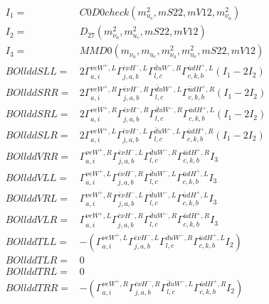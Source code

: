 \documentclass[A4,landscape]{article}
\begin{document}
\begin{align} 
I_1 = & C0D0check(m^2_{u_{{c}}}, mS22, mV12, m^2_{\nu_{{a}}}) \\ 
I_2 = & D_{27}(m^2_{\nu_{{a}}}, m^2_{u_{{c}}}, mS22, mV12) \\ 
I_3 = & MMD0(m_{\nu_{{a}}}, m_{u_{{c}}}, m^2_{\nu_{{a}}}, m^2_{u_{{c}}}, mS22, mV12) \\ 
  BOllddSLL= & 2  \Gamma^{\nu e W^+,L}_{a, i} \Gamma^{\bar{e}\nu H^- ,L}_{j, a, b} \Gamma^{\bar{d}u W^- ,R}_{l, c} \Gamma^{\bar{u}d H^+,L}_{c, k, b} (I_1 - 2 I_2) \\ 
  BOllddSRR= & 2  \Gamma^{\nu e W^+,R}_{a, i} \Gamma^{\bar{e}\nu H^- ,R}_{j, a, b} \Gamma^{\bar{d}u W^- ,L}_{l, c} \Gamma^{\bar{u}d H^+,R}_{c, k, b} (I_1 - 2 I_2) \\ 
  BOllddSRL= & 2  \Gamma^{\nu e W^+,R}_{a, i} \Gamma^{\bar{e}\nu H^- ,R}_{j, a, b} \Gamma^{\bar{d}u W^- ,R}_{l, c} \Gamma^{\bar{u}d H^+,L}_{c, k, b} (I_1 - 2 I_2) \\ 
  BOllddSLR= & 2  \Gamma^{\nu e W^+,L}_{a, i} \Gamma^{\bar{e}\nu H^- ,L}_{j, a, b} \Gamma^{\bar{d}u W^- ,L}_{l, c} \Gamma^{\bar{u}d H^+,R}_{c, k, b} (I_1 - 2 I_2) \\ 
  BOllddVRR= &  \Gamma^{\nu e W^+,R}_{a, i} \Gamma^{\bar{e}\nu H^- ,L}_{j, a, b} \Gamma^{\bar{d}u W^- ,R}_{l, c} \Gamma^{\bar{u}d H^+,R}_{c, k, b} I_3 \\ 
  BOllddVLL= &  \Gamma^{\nu e W^+,L}_{a, i} \Gamma^{\bar{e}\nu H^- ,R}_{j, a, b} \Gamma^{\bar{d}u W^- ,L}_{l, c} \Gamma^{\bar{u}d H^+,L}_{c, k, b} I_3 \\ 
  BOllddVRL= &  \Gamma^{\nu e W^+,R}_{a, i} \Gamma^{\bar{e}\nu H^- ,L}_{j, a, b} \Gamma^{\bar{d}u W^- ,L}_{l, c} \Gamma^{\bar{u}d H^+,L}_{c, k, b} I_3 \\ 
  BOllddVLR= &  \Gamma^{\nu e W^+,L}_{a, i} \Gamma^{\bar{e}\nu H^- ,R}_{j, a, b} \Gamma^{\bar{d}u W^- ,R}_{l, c} \Gamma^{\bar{u}d H^+,R}_{c, k, b} I_3 \\ 
  BOllddTLL= & -( \Gamma^{\nu e W^+,L}_{a, i} \Gamma^{\bar{e}\nu H^- ,L}_{j, a, b} \Gamma^{\bar{d}u W^- ,R}_{l, c} \Gamma^{\bar{u}d H^+,L}_{c, k, b} I_2) \\ 
  BOllddTLR= & 0 \\ 
  BOllddTRL= & 0 \\ 
  BOllddTRR= & -( \Gamma^{\nu e W^+,R}_{a, i} \Gamma^{\bar{e}\nu H^- ,R}_{j, a, b} \Gamma^{\bar{d}u W^- ,L}_{l, c} \Gamma^{\bar{u}d H^+,R}_{c, k, b} I_2) \\ 
\end{align} 
\end{document}
